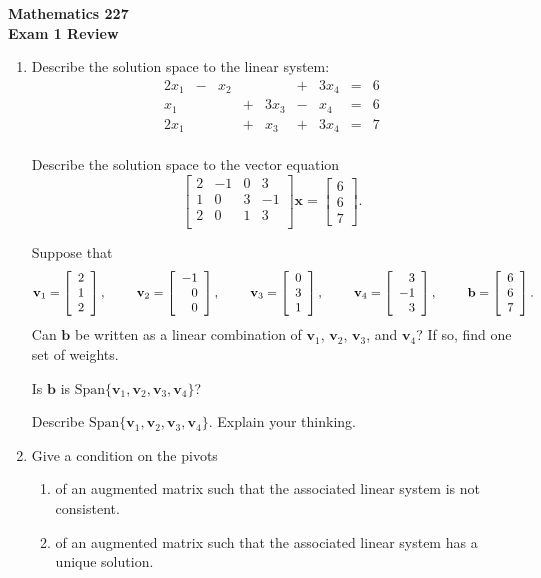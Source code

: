 \documentclass[12pt]{article}
\newcommand{\vs}[1]{\vspace{#1in}}
\newcommand{\bvec}{{\mathbf b}}
\newcommand{\vvec}{{\mathbf v}}
\newcommand{\xvec}{{\mathbf x}}
\newcommand{\threevec}[3]{\left[\begin{array}{r}#1 \\ #2 \\ #3
  \end{array}\right]}
\renewcommand{\span}[1]{\text{Span}\{#1\}}
\begin{document}
\noindent
{\bf Mathematics 227} \\ 
{\bf Exam 1 Review}

\bigskip
\begin{enumerate}
\item Describe the solution space to the linear system:
  $$
  \begin{alignedat}{5}
    2x_1 & {}-{} & x_2 & {}{} & & {}+{} & 3x_4 & {}={} & 6 \\
    x_1 & {}{} & & {}+{} & 3x_3 & {}-{} & x_4 & {}={} & 6 \\
    2x_1 & {}{} & & {}+{} & x_3 & {}+{} & 3x_4 & {}={} & 7 \\
  \end{alignedat}
  $$

  \vs{2}
  Describe the solution space to the vector equation
  $$
  \left[
    \begin{array}{cccc}
      2 & -1 & 0 & 3 \\
      1 & 0 & 3 & -1 \\
      2 & 0 & 1 & 3 \\
    \end{array}
  \right]
  \xvec = \threevec667.
  $$

  \vs{1.25}
  Suppose that
  $$
  \vvec_1=\threevec212, \hspace*{24pt}
  \vvec_2=\threevec{-1}00, \hspace*{24pt}
  \vvec_3=\threevec031, \hspace*{24pt}
  \vvec_4=\threevec3{-1}3, \hspace*{24pt}
  \bvec=\threevec667.
  $$
  Can $\bvec$ be written as a linear combination of $\vvec_1$,
  $\vvec_2$, $\vvec_3$, and $\vvec_4$?  If so, find one set of
  weights.

  \vs{1}
  \newpage
  Is $\bvec$ is $\span{\vvec_1,\vvec_2,\vvec_3,\vvec_4}$?

  \vs{1}
  Describe $\span{\vvec_1,\vvec_2,\vvec_3,\vvec_4}$.  Explain your thinking.

  \vs{1}

\item Give a condition on the pivots 
  \begin{enumerate}[label=(\alph*)]
  \item of an augmented matrix such that the associated linear system
    is not consistent. 

    \vs{0.75}
  \item of an augmented matrix such that the associated linear system
    has a unique solution.


\end{enumerate}
\end{enumerate}
\end{document}
